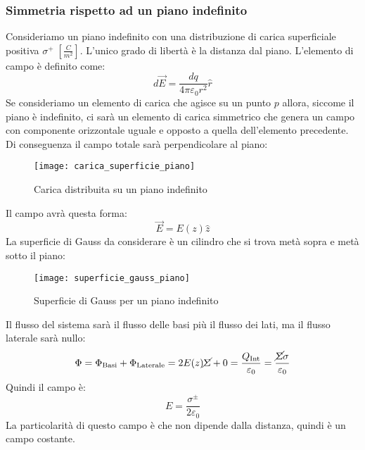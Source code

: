 \documentclass[a4paper]{article}
\begin{document}
\subsubsection{Simmetria rispetto ad un piano indefinito}
Consideriamo un piano indefinito con una distribuzione di carica superficiale 
positiva \( \sigma^+ \; \left[ \frac{C}{m^2} \right] \). L'unico grado di libertà
è la distanza dal piano. L'elemento di campo è definito come:
\[
  d\vec{E} = \frac{dq}{4 \pi \varepsilon_0 r^2} \hat{r}
\] 
Se consideriamo un elemento di carica che agisce su un punto \( p \) allora, siccome
il piano è indefinito, ci sarà un elemento di carica simmetrico che genera un campo
con componente orizzontale uguale e opposto a quella dell'elemento precedente.
Di conseguenza il campo totale sarà perpendicolare al piano:
\begin{figure}[H]
  \centering
  \texttt{[image: carica\_superficie\_piano]}
  \caption{Carica distribuita su un piano indefinito}
\end{figure}
\noindent
Il campo avrà questa forma:
\[
  \vec{E} = E(z) \hat{z}
\] 
La superficie di Gauss da considerare è un cilindro che si trova metà sopra e metà sotto
il piano:
\begin{figure}[H]
  \centering
  \texttt{[image: superficie\_gauss\_piano]}
  \caption{Superficie di Gauss per un piano indefinito}
\end{figure}
\noindent
Il flusso del sistema sarà il flusso delle basi più il flusso dei lati, ma il flusso
laterale sarà nullo:
\[
  \Phi = \Phi_{\text{Basi}} + \Phi_{\text{Laterale}} = 2 E(z) \cancel{\Sigma} + 0 
  = \frac{Q_{\text{Int}}}{\varepsilon_0} = \frac{\cancel{\Sigma} \sigma}{\varepsilon_0}
\] 
Quindi il campo è:
\[
  E = \frac{\sigma^\pm}{2 \varepsilon_0}
\] 
La particolarità di questo campo è che non dipende dalla distanza, quindi è un campo
costante.
\end{document}
